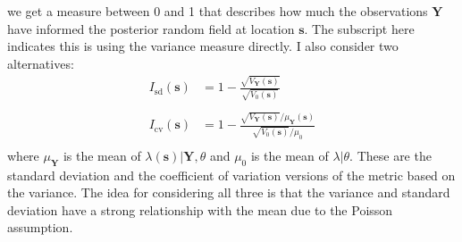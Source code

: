 \documentclass[12pt]{article}
\newcommand{\bm}{\boldsymbol}  %
\newcommand{\bs}{\boldsymbol{s}}
\begin{document}
we get a measure between 0 and 1 that describes how much the observations $\bm{Y}$ have informed the posterior random field at location $\bs$.  The subscript here indicates this is using the variance measure directly.  I also consider two alternatives:
\begin{align*}
	I_{\text{sd}}(\bs) &= 1 - \frac{\sqrt{V_{\bm{Y}}(\bs)}}{\sqrt{V_0(\bs)}} \\ \\
	I_{\text{cv}}(\bs) &= 1 - \frac{\sqrt{V_{\bm{Y}}(\bs)}/ \mu_{\bm{Y}}(\bs)}{\sqrt{V_0(\bs)}/\mu_0} \\
\end{align*}
where $\mu_{\bm{Y}}$ is the mean of $\lambda(\bs) | \bm{Y}, \theta$ and $\mu_0$ is the mean of $\lambda | \theta$.  These are the standard deviation and the coefficient of variation versions of the metric based on the variance.  The idea for considering all three is that the variance and standard deviation have a strong relationship with the mean due to the Poisson assumption. 
\end{document}
